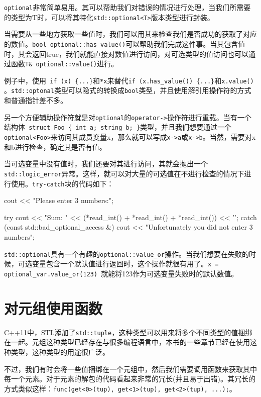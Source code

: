 
\texttt{optional}非常简单易用。其可以帮助我们对错误的情况进行处理，当我们所需要的类型为T时，可以将其特化\texttt{std::optional<T>}版本类型进行封装。

当需要从一些地方获取一些值时，我们可以用其来检查我们是否成功的获取了对应的数值。\texttt{bool optional::has\_value()}可以帮助我们完成这件事。当其包含值时，其会返回true，我们就能直接对数值进行访问，对可选类型的值访问也可以通过函数\texttt{T\& optional::value()}进行。

例子中，使用\texttt{ if (x) \{...\}}和\texttt{*x}来替代\texttt{if (x.has\_value()) \{...\}}和\texttt{x.value() }。\texttt{std::optonal}类型可以隐式的转换成\texttt{bool}类型，并且使用解引用操作符的方式和普通指针差不多。

另一个方便辅助操作符就是对\texttt{optional}的\texttt{operator->}操作符进行重载。当有一个结构体\texttt{ struct Foo \{ int a; string b; \}}类型，并且我们想要通过一个\texttt{optional<Foo>}来访问其成员变量x，那么就可以写成\texttt{x->a}或\texttt{x->b}。当然，需要对x和b进行检查，确定其是否有值。

当可选变量中没有值时，我们还要对其进行访问，其就会抛出一个\texttt{std::logic\_error}异常。这样，就可以对大量的可选值在不进行检查的情况下进行使用。\texttt{try-catch}块的代码如下：

\begin{codebox}[cpp]
cout << "Please enter 3 numbers:\n";

try {
    cout << "Sum: "
        << (*read_int() + *read_int() + *read_int())
        << '\n';
} catch (const std::bad_optional_access &) {
    cout << "Unfortunately you did not enter 3 numbers\n";
}
\end{codebox}

\texttt{std::optional}具有一个有趣的\texttt{optional::value\_or}操作。当我们想要在失败的时候，可选变量包含一个默认值进行返回时，这个操作就很有用了。\texttt{x = optional\_var.value\_or(123) }就能将123作为可选变量失败时的默认数值。


\section{对元组使用函数}

C++11中，STL添加了\texttt{std::tuple}，这种类型可以用来将多个不同类型的值捆绑在一起。元组这种类型已经存在与很多编程语言中，本书的一些章节已经在使用这种类型，这种类型的用途很广泛。

不过，我们有时会将一些值捆绑在一个元组中，然后我们需要调用函数来获取其中每一个元素。对于元素的解包的代码看起来非常的冗长(并且易于出错)。其冗长的方式类似这样：\texttt{func(get<0>(tup), get<1>(tup), get<2>(tup), ...);}。

